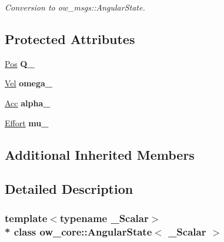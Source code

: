 \begin{DoxyCompactItemize}
\begin{DoxyCompactList}\small\item\em Conversion to ow\+\_\+msgs\+::\+Angular\+State. \end{DoxyCompactList}\end{DoxyCompactItemize}
\subsection*{Protected Attributes}
\begin{DoxyCompactItemize}
\item 
\hyperlink{classow__core_1_1AngularPosition}{Pos} {\bfseries Q\+\_\+}\hypertarget{classow__core_1_1AngularState_a624c594c1dd10e0f44b9b9b5081b4fa6}{}\label{classow__core_1_1AngularState_a624c594c1dd10e0f44b9b9b5081b4fa6}

\item 
\hyperlink{classow__core_1_1AngularVelocity}{Vel} {\bfseries omega\+\_\+}\hypertarget{classow__core_1_1AngularState_ac90730db456c8a6642ac972a2a9a48ca}{}\label{classow__core_1_1AngularState_ac90730db456c8a6642ac972a2a9a48ca}

\item 
\hyperlink{classow__core_1_1AngularAcceleration}{Acc} {\bfseries alpha\+\_\+}\hypertarget{classow__core_1_1AngularState_abea19876886c2b88078542cab569e7f0}{}\label{classow__core_1_1AngularState_abea19876886c2b88078542cab569e7f0}

\item 
\hyperlink{classow__core_1_1Moment}{Effort} {\bfseries mu\+\_\+}\hypertarget{classow__core_1_1AngularState_a16460d18249a21296141874e73c8abed}{}\label{classow__core_1_1AngularState_a16460d18249a21296141874e73c8abed}

\end{DoxyCompactItemize}
\subsection*{Additional Inherited Members}


\subsection{Detailed Description}
\subsubsection*{template$<$typename \+\_\+\+Scalar$>$\\*
class ow\+\_\+core\+::\+Angular\+State$<$ \+\_\+\+Scalar $>$}

